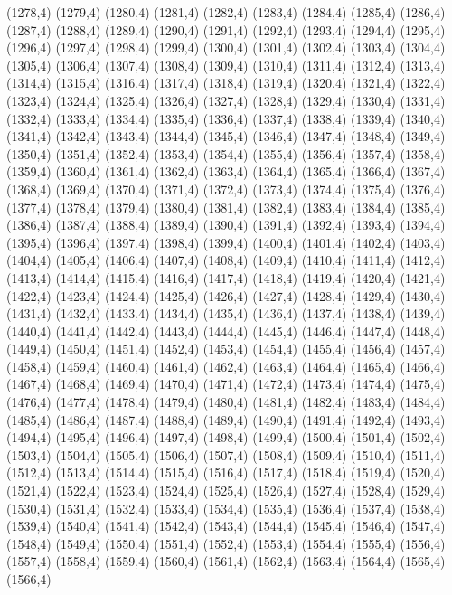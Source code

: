 (1278,4)
(1279,4)
(1280,4)
(1281,4)
(1282,4)
(1283,4)
(1284,4)
(1285,4)
(1286,4)
(1287,4)
(1288,4)
(1289,4)
(1290,4)
(1291,4)
(1292,4)
(1293,4)
(1294,4)
(1295,4)
(1296,4)
(1297,4)
(1298,4)
(1299,4)
(1300,4)
(1301,4)
(1302,4)
(1303,4)
(1304,4)
(1305,4)
(1306,4)
(1307,4)
(1308,4)
(1309,4)
(1310,4)
(1311,4)
(1312,4)
(1313,4)
(1314,4)
(1315,4)
(1316,4)
(1317,4)
(1318,4)
(1319,4)
(1320,4)
(1321,4)
(1322,4)
(1323,4)
(1324,4)
(1325,4)
(1326,4)
(1327,4)
(1328,4)
(1329,4)
(1330,4)
(1331,4)
(1332,4)
(1333,4)
(1334,4)
(1335,4)
(1336,4)
(1337,4)
(1338,4)
(1339,4)
(1340,4)
(1341,4)
(1342,4)
(1343,4)
(1344,4)
(1345,4)
(1346,4)
(1347,4)
(1348,4)
(1349,4)
(1350,4)
(1351,4)
(1352,4)
(1353,4)
(1354,4)
(1355,4)
(1356,4)
(1357,4)
(1358,4)
(1359,4)
(1360,4)
(1361,4)
(1362,4)
(1363,4)
(1364,4)
(1365,4)
(1366,4)
(1367,4)
(1368,4)
(1369,4)
(1370,4)
(1371,4)
(1372,4)
(1373,4)
(1374,4)
(1375,4)
(1376,4)
(1377,4)
(1378,4)
(1379,4)
(1380,4)
(1381,4)
(1382,4)
(1383,4)
(1384,4)
(1385,4)
(1386,4)
(1387,4)
(1388,4)
(1389,4)
(1390,4)
(1391,4)
(1392,4)
(1393,4)
(1394,4)
(1395,4)
(1396,4)
(1397,4)
(1398,4)
(1399,4)
(1400,4)
(1401,4)
(1402,4)
(1403,4)
(1404,4)
(1405,4)
(1406,4)
(1407,4)
(1408,4)
(1409,4)
(1410,4)
(1411,4)
(1412,4)
(1413,4)
(1414,4)
(1415,4)
(1416,4)
(1417,4)
(1418,4)
(1419,4)
(1420,4)
(1421,4)
(1422,4)
(1423,4)
(1424,4)
(1425,4)
(1426,4)
(1427,4)
(1428,4)
(1429,4)
(1430,4)
(1431,4)
(1432,4)
(1433,4)
(1434,4)
(1435,4)
(1436,4)
(1437,4)
(1438,4)
(1439,4)
(1440,4)
(1441,4)
(1442,4)
(1443,4)
(1444,4)
(1445,4)
(1446,4)
(1447,4)
(1448,4)
(1449,4)
(1450,4)
(1451,4)
(1452,4)
(1453,4)
(1454,4)
(1455,4)
(1456,4)
(1457,4)
(1458,4)
(1459,4)
(1460,4)
(1461,4)
(1462,4)
(1463,4)
(1464,4)
(1465,4)
(1466,4)
(1467,4)
(1468,4)
(1469,4)
(1470,4)
(1471,4)
(1472,4)
(1473,4)
(1474,4)
(1475,4)
(1476,4)
(1477,4)
(1478,4)
(1479,4)
(1480,4)
(1481,4)
(1482,4)
(1483,4)
(1484,4)
(1485,4)
(1486,4)
(1487,4)
(1488,4)
(1489,4)
(1490,4)
(1491,4)
(1492,4)
(1493,4)
(1494,4)
(1495,4)
(1496,4)
(1497,4)
(1498,4)
(1499,4)
(1500,4)
(1501,4)
(1502,4)
(1503,4)
(1504,4)
(1505,4)
(1506,4)
(1507,4)
(1508,4)
(1509,4)
(1510,4)
(1511,4)
(1512,4)
(1513,4)
(1514,4)
(1515,4)
(1516,4)
(1517,4)
(1518,4)
(1519,4)
(1520,4)
(1521,4)
(1522,4)
(1523,4)
(1524,4)
(1525,4)
(1526,4)
(1527,4)
(1528,4)
(1529,4)
(1530,4)
(1531,4)
(1532,4)
(1533,4)
(1534,4)
(1535,4)
(1536,4)
(1537,4)
(1538,4)
(1539,4)
(1540,4)
(1541,4)
(1542,4)
(1543,4)
(1544,4)
(1545,4)
(1546,4)
(1547,4)
(1548,4)
(1549,4)
(1550,4)
(1551,4)
(1552,4)
(1553,4)
(1554,4)
(1555,4)
(1556,4)
(1557,4)
(1558,4)
(1559,4)
(1560,4)
(1561,4)
(1562,4)
(1563,4)
(1564,4)
(1565,4)
(1566,4)
